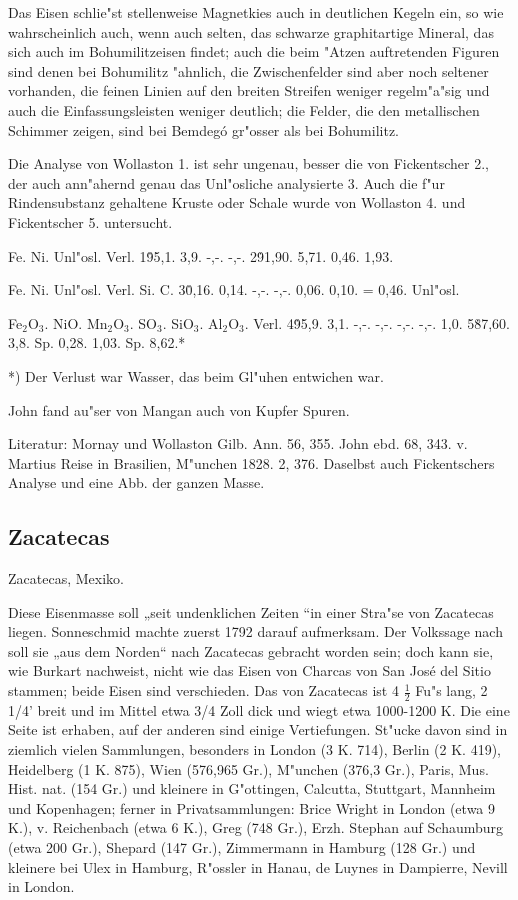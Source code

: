 \documentclass[a4paper, 11pt, oneside]{article}
\begin{document}
Das Eisen schlie"st stellenweise Magnetkies auch in deutlichen Kegeln ein, so wie wahrscheinlich auch, wenn auch selten, das schwarze graphitartige Mineral, das sich auch im Bohumilitzeisen findet; auch die beim "Atzen auftretenden Figuren sind denen bei Bohumilitz "ahnlich, die Zwischenfelder sind aber noch seltener vorhanden, die feinen Linien auf den breiten Streifen weniger regelm"a"sig und auch die Einfassungsleisten weniger deutlich; die Felder, die den metallischen Schimmer zeigen, sind bei Bemdegó gr"osser als bei Bohumilitz.

Die Analyse von Wollaston 1. ist sehr ungenau, besser die von Fickentscher 2., der auch ann"ahernd genau das Unl"osliche analysierte 3. Auch die f"ur Rindensubstanz gehaltene Kruste oder Schale wurde von Wollaston 4. und Fickentscher 5. untersucht.

Fe. Ni. Unl"osl. Verl.  
1\. 95,1. 3,9. -,-. -,-.  
2\. 91,90. 5,71. 0,46. 1,93.  

Fe. Ni. Unl"osl. Verl. Si. C.  
3\. 0,16. 0,14. -,-. -,-. 0,06. 0,10. = 0,46. Unl"osl.  

Fe$_{2}$O$_{3}$. NiO. Mn$_{2}$O$_{3}$. SO$_{3}$. SiO$_{3}$. Al$_{2}$O$_{3}$. Verl.  
4\. 95,9. 3,1. -,-. -,-. -,-. -,-. 1,0.  
5\. 87,60. 3,8. Sp. 0,28. 1,03. Sp. 8,62.*

*) Der Verlust war Wasser, das beim Gl"uhen entwichen war.

John fand au"ser von Mangan auch von Kupfer Spuren.

Literatur: Mornay und Wollaston Gilb. Ann. 56, 355. John ebd. 68, 343. v. Martius Reise in Brasilien, M"unchen 1828. 2, 376. Daselbst auch Fickentschers Analyse und eine Abb. der ganzen Masse.

\subsection{Zacatecas}

Zacatecas, Mexiko.

Diese Eisenmasse soll „seit undenklichen Zeiten “in einer Stra"se von Zacatecas liegen. Sonneschmid machte zuerst 1792 darauf aufmerksam. Der Volkssage nach soll sie „aus dem Norden“ nach Zacatecas gebracht worden sein; doch kann sie, wie Burkart nachweist, nicht wie das Eisen von Charcas von San José del Sitio stammen; beide Eisen sind verschieden. Das von Zacatecas ist 4 $\frac{1}{2}$ Fu"s lang, 2 1/4' breit und im Mittel etwa 3/4 Zoll dick und wiegt etwa 1000-1200 K. Die eine Seite ist erhaben, auf der anderen sind einige Vertiefungen. St"ucke davon sind in ziemlich vielen Sammlungen, besonders in London (3 K. 714), Berlin (2 K. 419), Heidelberg (1 K. 875), Wien (576,965 Gr.), M"unchen (376,3 Gr.), Paris, Mus. Hist. nat. (154 Gr.) und kleinere in G"ottingen, Calcutta, Stuttgart, Mannheim und Kopenhagen; ferner in Privatsammlungen: Brice Wright in London (etwa 9 K.), v. Reichenbach (etwa 6 K.), Greg (748 Gr.), Erzh. Stephan auf Schaumburg (etwa 200 Gr.), Shepard (147 Gr.), Zimmermann in Hamburg (128 Gr.) und kleinere bei Ulex in Hamburg, R"ossler in Hanau, de Luynes in Dampierre, Nevill in London.
\end{document}
